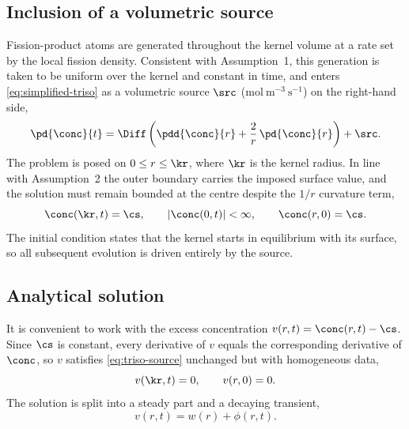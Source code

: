 
\subsection{Inclusion of a volumetric source}
Fission-product atoms are generated throughout the kernel volume at a rate set by the
local fission density. Consistent with Assumption~1, this generation is taken to be
uniform over the kernel and constant in time, and enters
\cref{eq:simplified-triso} as a volumetric source $\src$
($\mathrm{mol\ m^{-3}\ s^{-1}}$) on the right-hand side,
%
\begin{equation}
  \pd{\conc}{t}
  = \Diff \left( \pdd{\conc}{r} + \frac{2}{r}\,\pd{\conc}{r} \right) + \src .
  \label{eq:triso-source}
\end{equation}
%
The problem is posed on $0 \le r \le \kr$, where $\kr$ is the kernel radius. In line
with Assumption~2 the outer boundary carries the imposed surface value, and the
solution must remain bounded at the centre despite the $1/r$ curvature term,
%
\begin{equation}
  \conc(\kr,t) = \cs , \qquad
  \left| \conc(0,t) \right| < \infty , \qquad
  \conc(r,0) = \cs .
  \label{eq:bc-ic}
\end{equation}
%
The initial condition states that the kernel starts in equilibrium with its surface,
so all subsequent evolution is driven entirely by the source.

\subsection{Analytical solution}
It is convenient to work with the excess concentration
$v(r,t) = \conc(r,t) - \cs$. Since $\cs$ is constant, every derivative of $v$ equals
the corresponding derivative of $\conc$, so $v$ satisfies \cref{eq:triso-source}
unchanged but with homogeneous data,
%
\begin{equation}
  v(\kr,t) = 0 , \qquad v(r,0) = 0 .
  \label{eq:v-data}
\end{equation}
%
The solution is split into a steady part and a decaying transient,
%
\begin{equation}
  v(r,t) = w(r) + \phi(r,t) .
  \label{eq:split}
\end{equation}

